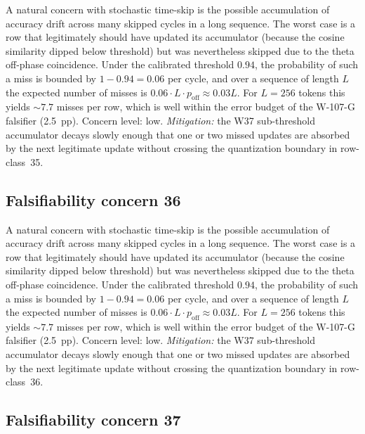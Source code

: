 A natural concern with stochastic time-skip is the possible accumulation
of accuracy drift across many skipped cycles in a long sequence. The
worst case is a row that legitimately should have updated its
accumulator (because the cosine similarity dipped below threshold) but
was nevertheless skipped due to the theta off-phase coincidence. Under
the calibrated threshold $0.94$, the probability of such a miss is
bounded by $1 - 0.94 = 0.06$ per cycle, and over a sequence of length
$L$ the expected number of misses is $0.06 \cdot L \cdot p_{\mathrm{off}}
\approx 0.03 L$. For $L = 256$ tokens this yields $\sim 7.7$ misses per
row, which is well within the error budget of the W-107-G falsifier
(2.5~pp). Concern level: low. \emph{Mitigation:} the W37 sub-threshold
accumulator decays slowly enough that one or two missed updates are
absorbed by the next legitimate update without crossing the
quantization boundary in row-class~35.


\subsection{Falsifiability concern 36}

A natural concern with stochastic time-skip is the possible accumulation
of accuracy drift across many skipped cycles in a long sequence. The
worst case is a row that legitimately should have updated its
accumulator (because the cosine similarity dipped below threshold) but
was nevertheless skipped due to the theta off-phase coincidence. Under
the calibrated threshold $0.94$, the probability of such a miss is
bounded by $1 - 0.94 = 0.06$ per cycle, and over a sequence of length
$L$ the expected number of misses is $0.06 \cdot L \cdot p_{\mathrm{off}}
\approx 0.03 L$. For $L = 256$ tokens this yields $\sim 7.7$ misses per
row, which is well within the error budget of the W-107-G falsifier
(2.5~pp). Concern level: low. \emph{Mitigation:} the W37 sub-threshold
accumulator decays slowly enough that one or two missed updates are
absorbed by the next legitimate update without crossing the
quantization boundary in row-class~36.


\subsection{Falsifiability concern 37}

